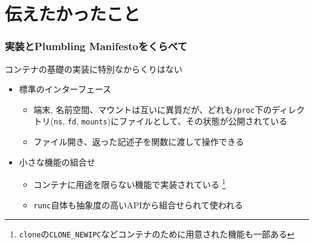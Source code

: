 \documentclass[unicode, 14pt, aspectratio=169]{beamer}
\begin{document}
\section{伝えたかったこと}
\begin{frame}[t]
  \frametitle{実装とPlumbling Manifestoをくらべて}
  \large
  コンテナの基礎の実装に特別なからくりはない
  \normalsize
  \begin{itemize}[leftmargin=0.8cm,label=$\circ$]
  \item 標準のインターフェース
    \begin{itemize}[leftmargin=0.8cm,label=$\circ$]
    \item 端末, 名前空間、マウントは互いに異質だが、どれも\texttt{/proc}下のディレクトリ(\texttt{ns}, \texttt{fd}, \texttt{mounts})にファイルとして、その状態が公開されている
    \item ファイル開き、返った記述子を関数に渡して操作できる
    \end{itemize}
  \item 小さな機能の組合せ
    \begin{itemize}[leftmargin=0.8cm,label=$\circ$]
      \item コンテナに用途を限らない機能で実装されている
        \footnote{\texttt{clone}の\texttt{CLONE\_NEWIPC}などコンテナのために用意された機能も一部ある\supercite{clone}}
      \item \texttt{runc}自体も抽象度の高いAPIから組合せられて使われる
    \end{itemize}
  \end{itemize}  
\end{frame}
\end{document}

